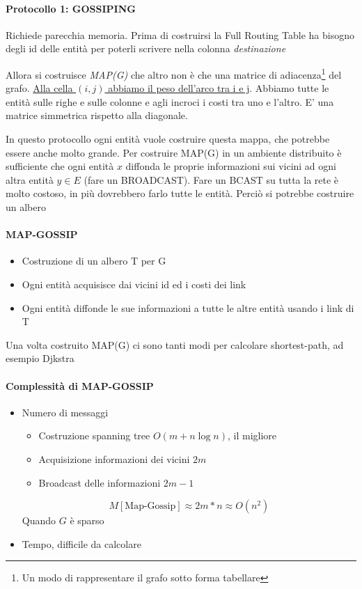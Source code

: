 \paragraph{Protocollo 1: GOSSIPING}
Richiede parecchia memoria.
Prima di costruirsi la Full Routing Table ha bisogno degli id delle entità per poterli scrivere nella colonna \textit{destinazione}

Allora si costruisce \textit{MAP(G)} che altro non è che una matrice di adiacenza\footnote{Un modo di rappresentare il grafo sotto forma tabellare} del grafo. \uline{Alla cella $(i,j)$ abbiamo il peso dell'arco tra i e j}. Abbiamo tutte le entità  sulle righe e sulle colonne e agli incroci i costi tra uno e l'altro. E' una matrice simmetrica rispetto alla diagonale.

In questo protocollo ogni entità vuole costruire questa mappa, che potrebbe essere anche molto grande. Per costruire MAP(G) in un ambiente distribuito è sufficiente che ogni entità $x$ diffonda le proprie informazioni sui vicini ad ogni altra entità $y \in E$ (fare un BROADCAST). Fare un BCAST su tutta la rete è molto costoso, in più dovrebbero farlo tutte le entità. Perciò si potrebbe costruire un albero

\paragraph{MAP-GOSSIP}
\begin{itemize}
    \item Costruzione di un albero T per G
    \item Ogni entità acquisisce dai vicini id ed i costi dei link
    \item Ogni entità diffonde le sue informazioni a tutte le altre entità usando i link di T
\end{itemize}
Una volta costruito MAP(G) ci sono tanti modi per calcolare shortest-path, ad esempio Djkstra

\paragraph{Complessità di MAP-GOSSIP}
\begin{itemize}
    \item Numero di messaggi
    \begin{itemize}
        \item Costruzione spanning tree $O(m + n \log n)$, il migliore
        \item Acquisizione informazioni dei vicini $2m$
        \item Broadcast delle informazioni $2m - 1$
    \end{itemize}
    $$M[\text{Map-Gossip}] \approx 2m * n \approx O(n^2)$$
    Quando $G$ è sparso
    \item Tempo, difficile da calcolare
\end{itemize}

